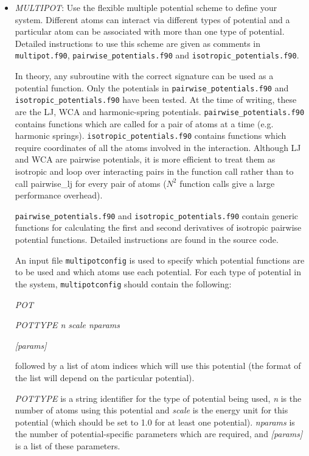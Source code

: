 \documentclass[12pt,a4paper,dvips]{article}
\begin{document}
\begin{itemize}
\item {\it MULTIPOT\/}: Use the flexible multiple potential scheme to define your system.
Different atoms can interact via different types of potential and a particular atom can be associated 
with more than one type of potential. Detailed instructions to use this scheme are given
as comments in {\tt multipot.f90}, { \tt pairwise\_potentials.f90} and {\tt isotropic\_potentials.f90}.

In theory, any subroutine with the correct signature can be used as a potential function. Only
the potentials in {\tt pairwise\_potentials.f90} and {\tt isotropic\_potentials.f90} have been tested.
At the time of writing, these are the LJ, WCA and harmonic-spring potentials. {\tt pairwise\_potentials.f90}
contains functions which are called for a pair of atoms at a time (e.g. harmonic springs). {\tt isotropic\_potentials.f90}
contains functions which require coordinates of all the atoms involved in the interaction. Although LJ and WCA are
pairwise potentials, it is more efficient to treat them as isotropic and loop over interacting pairs in the function
call rather than to call pairwise\_lj for every pair of atoms ($N^2$ function calls give a large performance overhead).

{\tt pairwise\_potentials.f90} and {\tt isotropic\_potentials.f90} contain generic functions for calculating the
first and second derivatives of isotropic pairwise potential functions. Detailed instructions are found in the source code.

An input file {\tt multipotconfig} is used to specify which potential functions are to be used and
which atoms use each potential. For each type of potential in the system, {\tt multipotconfig} should 
contain the following:

\vspace{0.5cm}

{ \it POT }

{ \it POTTYPE n scale nparams } 

{ \it [params] }

followed by a list of atom indices which will use this potential (the format of the list will depend 
on the particular potential). 

\vspace{0.5cm}

{ \it POTTYPE } is a string identifier for the type of potential being used,
{ \it n } is the number of atoms using this potential and { \it scale } is the energy unit for this potential
(which should be set to 1.0 for at least one potential). { \it nparams} is the number of potential-specific
parameters which are required, and { \it [params] } is a list of these parameters.


\end{itemize}
\end{document}
